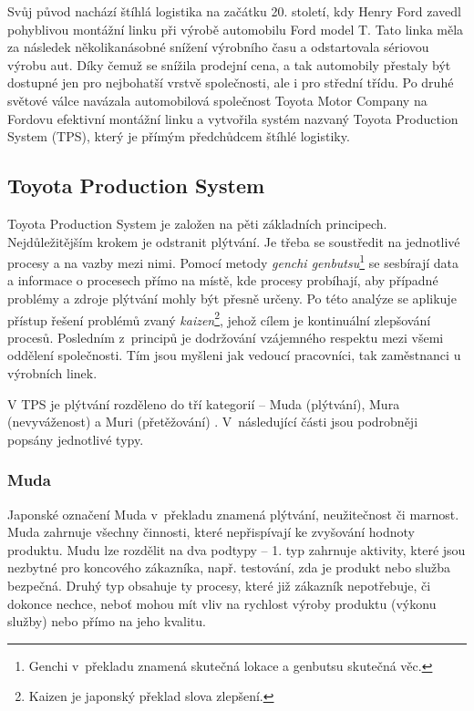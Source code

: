 Svůj původ nachází štíhlá logistika na začátku 20. století, kdy Henry Ford zavedl pohyblivou montážní linku při výrobě automobilu Ford model T. Tato linka měla za následek několikanásobné snížení výrobního času a odstartovala sériovou výrobu aut. Díky čemuž se snížila prodejní cena, a tak automobily přestaly být dostupné jen pro nejbohatší vrstvě společnosti, ale i pro střední třídu. 
Po druhé světové válce navázala automobilová společnost Toyota Motor Company na Fordovu efektivní montážní linku a vytvořila systém nazvaný Toyota Production System (TPS), který je přímým předchůdcem štíhlé logistiky.\cite{bib:seven}

\subsection{Toyota Production System}

Toyota Production System je založen na pěti základních principech. Nejdůležitějším krokem je odstranit plýtvání. Je třeba se soustředit na jednotlivé procesy a na vazby mezi nimi. Pomocí metody \emph{genchi genbutsu}\footnote{Genchi v~překladu znamená skutečná lokace a genbutsu skutečná věc.} se sesbírají data a informace o procesech přímo na místě, kde procesy probíhají, aby případné problémy a zdroje plýtvání mohly být přesně určeny. Po této analýze se aplikuje přístup řešení problémů zvaný \emph{kaizen}\footnote{Kaizen je japonský překlad slova zlepšení.}, jehož cílem je kontinuální zlepšování procesů. Posledním z~principů je  dodržování vzájemného respektu mezi všemi oddělení společnosti. Tím jsou myšleni jak vedoucí pracovníci, tak zaměstnanci u výrobních linek.\cite{bib:seven}

V TPS je plýtvání rozděleno do tří kategorií -- Muda (plýtvání), Mura (nevyváženost) a Muri (přetěžování) \cite{bib:LW3}. V~následující části jsou podrobněji popsány jednotlivé typy.

\subsubsection*{Muda}

Japonské označení Muda v~překladu znamená plýtvání, neužitečnost či marnost. Muda zahrnuje všechny činnosti, které nepřispívají ke zvyšování hodnoty produktu. Mudu lze rozdělit na dva podtypy -- 1. typ zahrnuje aktivity, které jsou nezbytné pro koncového zákazníka, např. testování, zda je produkt nebo služba bezpečná. Druhý typ obsahuje ty procesy, které již zákazník nepotřebuje, či dokonce nechce, neboť mohou mít vliv na rychlost výroby produktu (výkonu služby) nebo přímo na jeho kvalitu.


